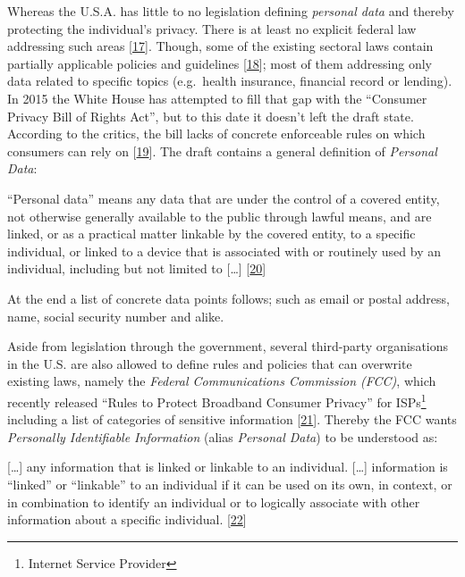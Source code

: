 \documentclass[12pt,english,a4paper,titlepage,cleardoublepage=empty,dottedtoc]{report}
\let\origquote\quote
\let\endorigquote\endquote
\renewenvironment{quote}{%
    \origquote
    \itshape
}
{\endorigquote}
\begin{document}
Whereas the U.S.A. has little to no legislation defining \emph{personal
data} and thereby protecting the individual's privacy. There is at least
no explicit federal law addressing such areas
{[}\protect\hyperlink{ref-web_2016_wikipedia_information-privacy-law_us}{17}{]}.
Though, some of the existing sectoral laws contain partially applicable
policies and guidelines
{[}\protect\hyperlink{ref-web_2016_data-protection-laws-in-the-us}{18}{]};
most of them addressing only data related to specific topics
(e.g.~health insurance, financial record or lending). In 2015 the White
House has attempted to fill that gap with the ``Consumer Privacy Bill of
Rights Act'', but to this date it doesn't left the draft state.
According to the critics, the bill lacks of concrete enforceable rules
on which consumers can rely on
{[}\protect\hyperlink{ref-web_2015_white-house-releases-consumer-privacy-bill-draft}{19}{]}.
The draft contains a general definition of \emph{Personal Data}:

\begin{quote}
``Personal data'' means any data that are under the control of a covered
entity, not otherwise generally available to the public through lawful
means, and are linked, or as a practical matter linkable by the covered
entity, to a specific individual, or linked to a device that is
associated with or routinely used by an individual, including but not
limited to {[}\ldots{}{]}
{[}\protect\hyperlink{ref-bill-draft_2015_us_consumer-privacy-bill-of-rights-act_definition}{20}{]}
\end{quote}

At the end a list of concrete data points follows; such as email or
postal address, name, social security number and alike.

Aside from legislation through the government, several third-party
organisations in the U.S. are also allowed to define rules and policies
that can overwrite existing laws, namely the \emph{Federal
Communications Commission (FCC)}, which recently released ``Rules to
Protect Broadband Consumer Privacy'' for ISPs\footnote{Internet Service
  Provider} including a list of categories of sensitive information
{[}\protect\hyperlink{ref-rules_2016_fcc_to-protect-broadband-consumer-privacy_sensitive-types-of-data}{21}{]}.
Thereby the FCC wants \emph{Personally Identifiable Information} (alias
\emph{Personal Data}) to be understood as:

\begin{quote}
{[}\ldots{}{]} any information that is linked or linkable to an
individual. {[}\ldots{}{]} information is ``linked'' or ``linkable'' to
an individual if it can be used on its own, in context, or in
combination to identify an individual or to logically associate with
other information about a specific individual.
{[}\protect\hyperlink{ref-rules_2016_fcc_to-protect-broadband-consumer-privacy_personally-identifiable-information}{22}{]}
\end{quote}
\end{document}
